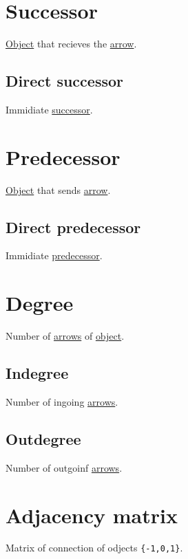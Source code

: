 \documentclass[a4paper,14pt,oneside]{book}
\begin{document}
\section{\label{org494d2a8}Successor}
\label{sec:org11140b9}
\hyperref[org5771609]{Object} that recieves the \hyperref[orga10ccdb]{arrow}.\\

\subsection{\label{orgdb1d7e1}Direct successor}
\label{sec:orgc871b74}
Immidiate \hyperref[org494d2a8]{successor}.\\

\section{\label{org6a7a577}Predecessor}
\label{sec:org6df3808}
\hyperref[org5771609]{Object} that sends \hyperref[orga10ccdb]{arrow}.\\

\subsection{\label{org4033839}Direct predecessor}
\label{sec:orgd338055}
Immidiate \hyperref[org6a7a577]{predecessor}.\\


\section{\label{org8506557}Degree}
\label{sec:org71a478e}
Number of \hyperref[org516b7ab]{arrows} of \hyperref[org5771609]{object}.\\

\subsection{\label{orgbd39b2f}Indegree}
\label{sec:orged5fab3}
Number of ingoing \hyperref[org516b7ab]{arrows}.\\

\subsection{\label{orgf488c36}Outdegree}
\label{sec:orgf98153b}
Number of outgoinf \hyperref[org516b7ab]{arrows}.\\

\section{\label{orgbfd14e0}Adjacency matrix}
\label{sec:org7963b4c}
Matrix of connection of odjects \texttt{\{-1,0,1\}}.\\
\end{document}
